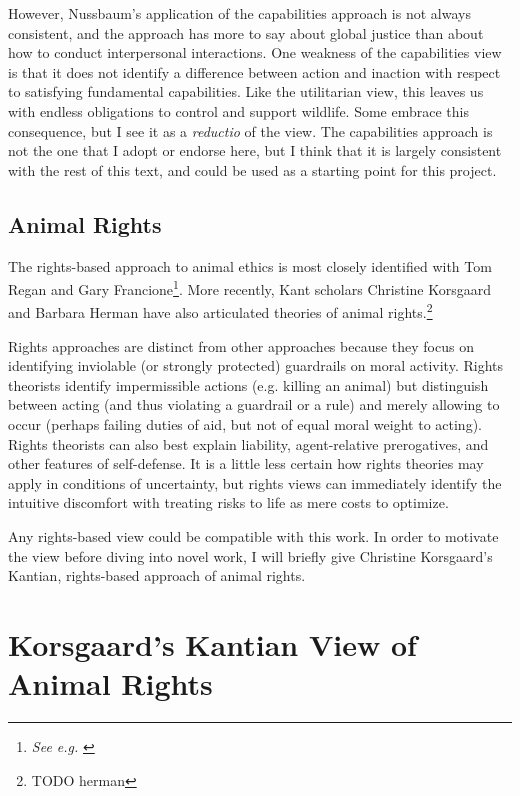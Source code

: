 	However, Nussbaum’s application of the capabilities approach is not always
	consistent,\autocite[404]{nussbaum_frontiers} and the approach has more to
	say about global justice than about how to conduct interpersonal
	interactions.  One weakness of the capabilities view is that it does not
	identify a difference between action and inaction with respect to
	satisfying fundamental capabilities. Like the utilitarian view, this leaves
	us with endless obligations to control and support wildlife. Some embrace
	this consequence, but I see it as a \emph{reductio} of the view.  The
	capabilities approach is not the one that I adopt or endorse here, but I
	think that it is largely consistent with the rest of this text, and could
	be used as a starting point for this project.

	\subsection{Animal Rights}

	The rights-based approach to animal ethics is most closely identified with
	Tom Regan and Gary Francione\footnote{\emph{See e.g.}
	\cite{palmer_animal_context}}. More recently, Kant scholars Christine
	Korsgaard and Barbara Herman have also articulated theories of animal
	rights.\footnote{\cite{korsgaard_fellow_creatures} TODO herman}

	Rights approaches are distinct from other approaches because they focus on
	identifying inviolable (or strongly protected) guardrails on moral
	activity.  Rights theorists identify impermissible actions (e.g. killing an
	animal) but distinguish between acting (and thus violating a guardrail or a
	rule) and merely allowing to occur (perhaps failing duties of aid, but not
	of equal moral weight to acting).  Rights theorists can also best explain
	liability, agent-relative prerogatives, and other features of self-defense.
	It is a little less certain how rights theories may apply in conditions of
	uncertainty, but rights views can immediately identify the intuitive
	discomfort with treating risks to life as mere costs to optimize.

	Any rights-based view could be compatible with this work. In order to
	motivate the view before diving into novel work, I will briefly give
	Christine Korsgaard’s Kantian, rights-based approach of animal rights.

	\section{Korsgaard’s Kantian View of Animal Rights}
		
